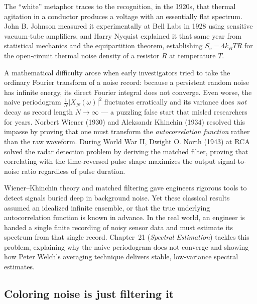 \begin{historybox}
The ``white'' metaphor traces to the recognition, in the 1920s, that thermal
agitation in a conductor produces a voltage with an essentially flat spectrum.
John B. Johnson measured it experimentally at Bell Labs in 1928 using sensitive vacuum-tube
amplifiers, and Harry Nyquist explained it that same year from statistical mechanics and
the equipartition theorem, establishing $S_v = 4 k_B T R$ for the open-circuit thermal
noise density of a resistor $R$ at temperature $T$.

A mathematical difficulty arose when early investigators tried to take the ordinary
Fourier transform of a noise record: because a persistent random noise has infinite energy,
its direct Fourier integral does not converge. Even worse, the naive periodogram
$\tfrac{1}{N}|X_N(\omega)|^2$ fluctuates erratically and its variance does \emph{not} decay
as record length $N \to \infty$ --- a puzzling false start that misled researchers for
years. Norbert Wiener (1930) and Aleksandr Khinchin (1934) resolved this impasse by
proving that one must transform the \emph{autocorrelation function} rather than the raw
waveform. During World War II, Dwight O. North (1943) at RCA solved the radar
detection problem by deriving the matched filter, proving that correlating with the
time-reversed pulse shape maximizes the output signal-to-noise ratio regardless of
pulse duration.

Wiener--Khinchin theory and matched filtering gave engineers rigorous tools to detect
signals buried deep in background noise. Yet these classical results assumed an idealized
infinite ensemble, or that the true underlying autocorrelation function is known in advance.
In the real world, an engineer is handed a single finite recording of noisy sensor data and
must estimate its spectrum from that single record. Chapter~21 (\emph{Spectral Estimation})
tackles this problem, explaining why the naive periodogram does not converge and
showing how Peter Welch's averaging technique delivers stable, low-variance spectral estimates.
\end{historybox}

\subsection{Coloring noise is just filtering it}
\label{ch20:filtered}


